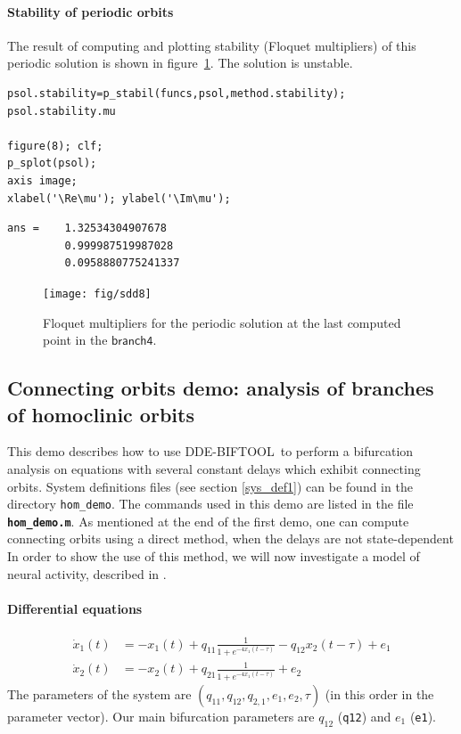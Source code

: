 \documentclass[10pt]{scrartcl}
\newcommand{\DDEBIFCODE}{\textsc{DDE-BIFTOOL}}
\newcommand{\file}[1]{\textbf{\texttt{#1}}}
\newcommand{\parm}[1]{\mathsf{#1}}
\renewcommand{\Re}{\operatorname{Re}}
\renewcommand{\Im}{\operatorname{Im}}
\newcommand{\blist}[1]{\mbox{\lstinline!#1!}}
\begin{document}
\paragraph{Stability of periodic orbits}
The result of computing and plotting stability (Floquet multipliers) 
of this periodic solution is shown in 
figure~\ref{sd_dde_mu}. The solution is unstable.
\begin{lstlisting}
psol.stability=p_stabil(funcs,psol,method.stability);
psol.stability.mu

figure(8); clf;
p_splot(psol);
axis image;
xlabel('\Re\mu'); ylabel('\Im\mu');  
\end{lstlisting}
{\small
\begin{verbatim}
ans =    1.32534304907678
         0.999987519987028
         0.0958880775241337
\end{verbatim}}
\begin{figure}[h]
  \begin{center}
    \texttt{[image: fig/sdd8]}
  \end{center}
  \caption{\label{sd_dde_mu}Floquet multipliers for the periodic 
    solution at the last computed point in the $\parm{branch4}$.} 
\end{figure}


\subsection{Connecting orbits demo: analysis of branches of homoclinic
  orbits}\label{demo3}
This demo describes how to use \DDEBIFCODE\ to perform a bifurcation
analysis on equations with several constant delays which exhibit
connecting orbits.  System definitions files (see section
\ref{sys_def1}) can be found in the directory \texttt{hom\_demo}.  The
commands used in this demo are listed in the file \file{hom\_demo.m}.
As mentioned at the end of the first demo, one can compute connecting
orbits using a direct method, when the delays are not state-dependent
In order to show the use of this method, we will now investigate a
model of neural activity, described in \cite{zapp}.  

\paragraph{Differential equations}
\begin{equation}\label{z}
  \begin{split}
    \dot{x}_{1}(t)&=-x_{1}(t)+q_{11}\frac{1}{1+e^{-4x_{1}(t-\tau)}}-q_{12}x_2(t-\tau) +e_1\\
    \dot{x}_{2}(t)&=-x_2(t)+q_{21}\frac{1}{1+e^{-4x_{1}(t-\tau)}}+e_2
  \end{split}
\end{equation}
The parameters of the system are
$(q_{11},q_{12},q_{2,1},e_1,e_2,\tau)$ (in this order in the parameter
vector). Our main bifurcation parameters are $q_{12}$ (\blist{q12})
and $e_1$ (\blist{e1}).
\end{document}
